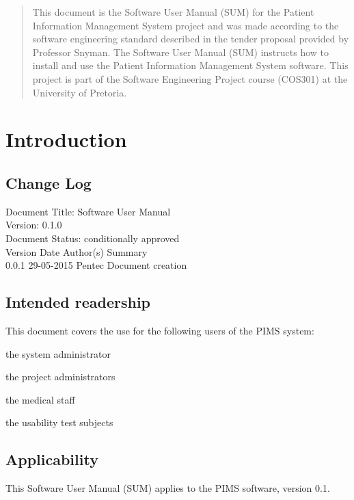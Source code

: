 \documentclass[14pt, a4paper]{article}
\begin{document}


\begin{abstract}
\Large
This document is the Software User Manual (SUM) for the Patient Information Management System project and was made according to the software engineering standard described in the tender proposal provided by Professor Snyman. The Software User Manual (SUM) instructs how to install and use the
Patient Information Management System software. This project is part of the Software Engineering Project course (COS301) at the University of Pretoria.\\
\end{abstract}

\newpage

\tableofcontents
\newpage

\section{Introduction}


\subsection{Change Log}
Document Title: Software User Manual\\
Version: 0.1.0\\
Document Status: conditionally approved\\
Version Date Author(s) Summary\\
0.0.1 29-05-2015 Pentec Document creation\\


\subsection{Intended readership}
This document covers the use for the following users of the PIMS system:\\
\begin{description}
\item the system administrator
\item the project administrators
\item the medical staff
\item the usability test subjects
\end{description}

\subsection{Applicability}
This Software User Manual (SUM) applies to the PIMS software, version 0.1.\\
\end{document}
